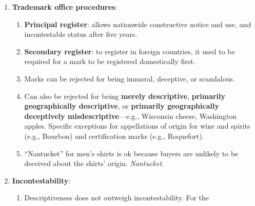 \begin{enumerate}
\begin{enumerate}
\begin{enumerate}
            registered with a bona fide intent to use in 
            commerce.\footnote{Casebook p. 828.}
            \item Knowledge that another person plans to use a mark does not 
            prevent you from using it. However, the \textbf{intent to use} 
            rule lets someone ``reserve'' a mark if it is actually used within 
            six months (extendable to up to three years for good cause). \S\ 
            1051(b), Lanham \S\ 1(b). \emph{Zazu}.
            \item Registration establishes national priority. For unregistered 
            marks, concurrent users can expand their geographic areas unless 
            it causes confusion.
            \item Two types of \textbf{concurrent use}: (1) different products 
            in the same market, (2) different geographic markets.
        \end{enumerate}
        \item \textbf{Trademark office procedures}:
        \begin{enumerate}
            \item \textbf{Principal register}: allows nationwide constructive 
            notice and use, and incontestable status after five years.
            \item \textbf{Secondary register}: to register in foreign 
            countries, it used to be required for a mark to be registered 
            domestically first.
            \item Marks can be rejected for being immoral, deceptive, or 
            scandalous.
            \item Can also be rejected for being \textbf{merely descriptive}, 
            \textbf{primarily geographically descriptive}, or 
            \textbf{primarily geographically deceptively 
            misdescriptive}---e.g., Wisconsin cheese, Washington apples.  
            Specific exceptions for appellations of origin for wine and 
            spirits (e.g., Bourbon) and certification marks (e.g., Roquefort).
            \item ``Nantucket'' for men's shirts is ok because buyers are 
            unlikely to be deceived about the shirts' origin.  
            \emph{Nantucket}.
        \end{enumerate}
        \item \textbf{Incontestability}:
        \begin{enumerate}
            \item Descriptiveness does not outweigh incontestability. For the 

\end{enumerate}
\end{enumerate}
\end{enumerate}
